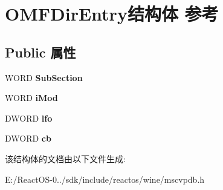 \hypertarget{struct_o_m_f_dir_entry}{}\section{O\+M\+F\+Dir\+Entry结构体 参考}
\label{struct_o_m_f_dir_entry}
\subsection*{Public 属性}
\begin{DoxyCompactItemize}
\item 
\mbox{\label{struct_o_m_f_dir_entry_a2aa0c8794b61d68773bf6c399e494143}} 
W\+O\+RD {\bfseries Sub\+Section}
\item 
\mbox{\label{struct_o_m_f_dir_entry_ada01e2e5ab5a8577c22f1f8af221d934}} 
W\+O\+RD {\bfseries i\+Mod}
\item 
\mbox{\label{struct_o_m_f_dir_entry_a2c28fe1b2a34fbcf08ee8a4d440ed722}} 
D\+W\+O\+RD {\bfseries lfo}
\item 
\mbox{\label{struct_o_m_f_dir_entry_ab9ee5d167bc142bc351137ee952ed3aa}} 
D\+W\+O\+RD {\bfseries cb}
\end{DoxyCompactItemize}


该结构体的文档由以下文件生成\+:\begin{DoxyCompactItemize}
\item 
E\+:/\+React\+O\+S-\/0../sdk/include/reactos/wine/mscvpdb.\+h\end{DoxyCompactItemize}
